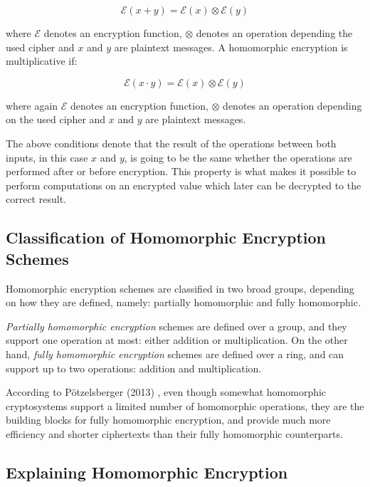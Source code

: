 \[
\mathcal{E}(x+y) = \mathcal{E}(x)\otimes \mathcal{E}(y)
\]

where $\mathcal{E}$ denotes an encryption function, $\otimes$ denotes an operation depending the used cipher and $x$ and $y$ are plaintext messages. A homomorphic encryption is multiplicative if:

\[
\mathcal{E}(x \cdot y) = \mathcal{E}(x) \otimes \mathcal{E}(y)
\]

where again $\mathcal{E}$ denotes an encryption function, $\otimes$ denotes an operation depending on the used cipher and $x$ and $y$ are plaintext messages.

The above conditions denote that the result of the operations between both inputs, in this case $x$ and $y$, is going to be the same whether the operations are performed after or before encryption. This property is what makes it possible to perform computations on an encrypted value which later can be decrypted to the correct result.

\subsection{Classification of Homomorphic Encryption Schemes}

Homomorphic encryption schemes are classified in two broad groups, depending on how they are defined, namely: partially homomorphic and fully homomorphic. 

\textit{Partially homomorphic encryption} schemes are defined over a group, and they support one operation at most: either addition or multiplication. On the other hand, \textit{fully homomorphic encryption} schemes are defined over a ring, and can support up to two operations: addition and multiplication.

According to P{\"o}tzelsberger (2013) \cite{potzelsberger2013kv}, even though somewhat homomorphic cryptosystems support a limited number of homomorphic operations, they are the building blocks for fully homomorphic encryption, and provide much more efficiency and shorter ciphertexts than their fully homomorphic counterparts. 


\subsection{Explaining Homomorphic Encryption}

